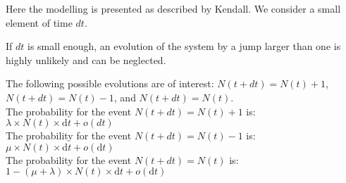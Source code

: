 \documentclass{article}
\begin{document}
Here the modelling is presented as described by Kendall. We consider a small element of time $dt$.


If $dt$ is small enough, an evolution of the system by a jump larger than one is highly unlikely and can be neglected.

The following possible evolutions are of interest: $N(t+dt)=N(t)+1$, $N(t+dt)=N(t)-1$, and $N(t+dt)=N(t)$.\\

The probability for the event $N(t+dt)=N(t)+1$ is: $\lambda \times N(t) \times \mathrm{d}t+o(dt)$ \\

The probability for the event $N(t+dt)=N(t)-1$ is: $\mu \times N(t) \times \mathrm{d}t +o(\mathrm{d}t)$ \\

The probability for the event $N(t+dt)=N(t)$ is: $1 - (\mu+\lambda) \times N(t) \times \mathrm{d}t +o(\mathrm{d}t)$ \\
\end{document}
